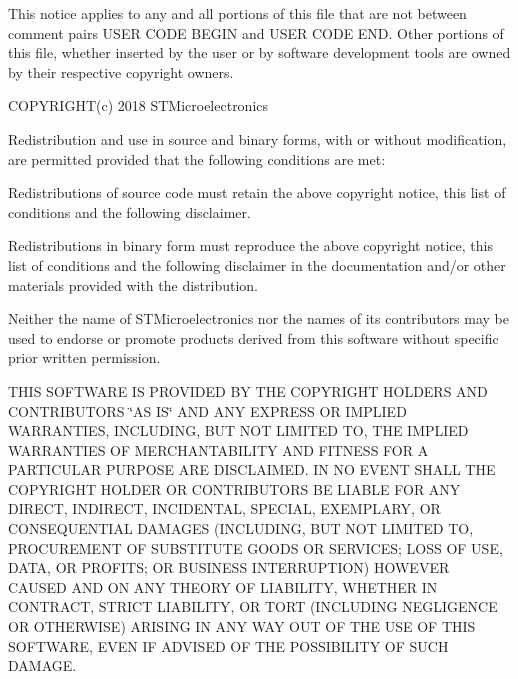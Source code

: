 This notice applies to any and all portions of this file that are not between comment pairs U\+S\+ER C\+O\+DE B\+E\+G\+IN and U\+S\+ER C\+O\+DE E\+ND. Other portions of this file, whether inserted by the user or by software development tools are owned by their respective copyright owners.

C\+O\+P\+Y\+R\+I\+G\+H\+T(c) 2018 S\+T\+Microelectronics

Redistribution and use in source and binary forms, with or without modification, are permitted provided that the following conditions are met\+:
\begin{DoxyEnumerate}
\item Redistributions of source code must retain the above copyright notice, this list of conditions and the following disclaimer.
\item Redistributions in binary form must reproduce the above copyright notice, this list of conditions and the following disclaimer in the documentation and/or other materials provided with the distribution.
\item Neither the name of S\+T\+Microelectronics nor the names of its contributors may be used to endorse or promote products derived from this software without specific prior written permission.
\end{DoxyEnumerate}

T\+H\+IS S\+O\+F\+T\+W\+A\+RE IS P\+R\+O\+V\+I\+D\+ED BY T\+HE C\+O\+P\+Y\+R\+I\+G\+HT H\+O\+L\+D\+E\+RS A\+ND C\+O\+N\+T\+R\+I\+B\+U\+T\+O\+RS \char`\"{}\+A\+S I\+S\char`\"{} A\+ND A\+NY E\+X\+P\+R\+E\+SS OR I\+M\+P\+L\+I\+ED W\+A\+R\+R\+A\+N\+T\+I\+ES, I\+N\+C\+L\+U\+D\+I\+NG, B\+UT N\+OT L\+I\+M\+I\+T\+ED TO, T\+HE I\+M\+P\+L\+I\+ED W\+A\+R\+R\+A\+N\+T\+I\+ES OF M\+E\+R\+C\+H\+A\+N\+T\+A\+B\+I\+L\+I\+TY A\+ND F\+I\+T\+N\+E\+SS F\+OR A P\+A\+R\+T\+I\+C\+U\+L\+AR P\+U\+R\+P\+O\+SE A\+RE D\+I\+S\+C\+L\+A\+I\+M\+ED. IN NO E\+V\+E\+NT S\+H\+A\+LL T\+HE C\+O\+P\+Y\+R\+I\+G\+HT H\+O\+L\+D\+ER OR C\+O\+N\+T\+R\+I\+B\+U\+T\+O\+RS BE L\+I\+A\+B\+LE F\+OR A\+NY D\+I\+R\+E\+CT, I\+N\+D\+I\+R\+E\+CT, I\+N\+C\+I\+D\+E\+N\+T\+AL, S\+P\+E\+C\+I\+AL, E\+X\+E\+M\+P\+L\+A\+RY, OR C\+O\+N\+S\+E\+Q\+U\+E\+N\+T\+I\+AL D\+A\+M\+A\+G\+ES (I\+N\+C\+L\+U\+D\+I\+NG, B\+UT N\+OT L\+I\+M\+I\+T\+ED TO, P\+R\+O\+C\+U\+R\+E\+M\+E\+NT OF S\+U\+B\+S\+T\+I\+T\+U\+TE G\+O\+O\+DS OR S\+E\+R\+V\+I\+C\+ES; L\+O\+SS OF U\+SE, D\+A\+TA, OR P\+R\+O\+F\+I\+TS; OR B\+U\+S\+I\+N\+E\+SS I\+N\+T\+E\+R\+R\+U\+P\+T\+I\+ON) H\+O\+W\+E\+V\+ER C\+A\+U\+S\+ED A\+ND ON A\+NY T\+H\+E\+O\+RY OF L\+I\+A\+B\+I\+L\+I\+TY, W\+H\+E\+T\+H\+ER IN C\+O\+N\+T\+R\+A\+CT, S\+T\+R\+I\+CT L\+I\+A\+B\+I\+L\+I\+TY, OR T\+O\+RT (I\+N\+C\+L\+U\+D\+I\+NG N\+E\+G\+L\+I\+G\+E\+N\+CE OR O\+T\+H\+E\+R\+W\+I\+SE) A\+R\+I\+S\+I\+NG IN A\+NY W\+AY O\+UT OF T\+HE U\+SE OF T\+H\+IS S\+O\+F\+T\+W\+A\+RE, E\+V\+EN IF A\+D\+V\+I\+S\+ED OF T\+HE P\+O\+S\+S\+I\+B\+I\+L\+I\+TY OF S\+U\+CH D\+A\+M\+A\+GE. 